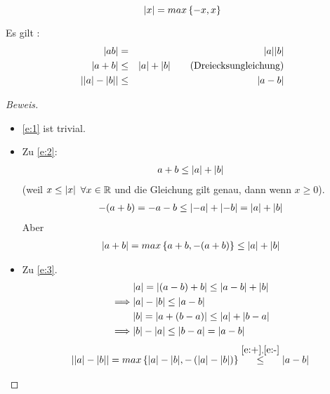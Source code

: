 \begin{Bem}
  $$\abs{x}=max\left\{ -x,x \right\}$$
\end{Bem}
\begin{Sat}
  Es gilt :
  \begin{eqnarray}
    \abs{ab}&=&\abs{a}\abs{b}\label{e:1}\\
    \abs{a+b}&\leq&\abs{a}+\abs{b}\qquad \mbox{(Dreiecksungleichung)}\label{e:2}\\
    \abs{\abs{a}-\abs{b}}&\leq&\abs{a-b}\label{e:3}
  \end{eqnarray}
\end{Sat}
\begin{proof}[Beweis]
  \begin{itemize}
    \item \eqref{e:1} ist trivial.
    \item Zu \eqref{e:2}:
      \begin{align*}
         a+b\leq \abs{a}+\abs{b} 
      \end{align*}
      (weil $x\leq\abs{x}$ $\forall x\in\mb{R}$ und die Gleichung gilt genau, dann wenn $x\geq 0$).
      \begin{align*}
        -(a+b)=-a-b\leq \abs{-a}+\abs{-b} = \abs{a}+\abs{b}
      \end{align*}
      Aber
      \begin{align*}
        \abs{a+b}=max\left\{ a+b, -(a+b) \right\}\leq \abs{a}+\abs{b}
      \end{align*}
    \item Zu \eqref{e:3}.
      \begin{eqnarray}
        &\abs{a}=\abs{(a-b)+b}\leq \abs{a-b} + \abs{b} \nonumber\\
        \implies &\abs{a}-\abs{b}\leq \abs{a-b} \label{e:+}\\
        &\abs{b}=\abs{a+(b-a)}\leq \abs{a}+\abs{b-a}\nonumber\\
        \implies &\abs{b}-\abs{a}\leq \abs{b-a} = \abs{a-b} \label{e:-}
      \end{eqnarray}
      \begin{align*}
        \abs{\abs{a}-\abs{b}}=max\left\{ \abs{a}-\abs{b}, -\left( \abs{a}-\abs{b} \right) \right\}\stackrel
{\eqref{e:+}, \eqref{e:-}}{\leq}\abs{a-b}
      \end{align*}
  \end{itemize}
\end{proof}
